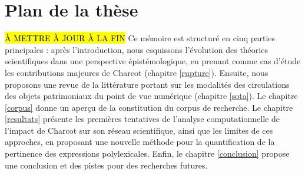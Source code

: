 \section{Plan de la thèse}
\hl{À METTRE À JOUR À LA FIN}
Ce mémoire est structuré en cinq parties principales : après l'introduction, nous esquissons l'évolution des théories scientifiques dans une perspective épistémologique, en prenant comme cas d'étude les contributions majeures de Charcot (chapitre \ref{rupture}).
Ensuite, nous proposons une revue de la littérature portant sur les modalités des circulations des objets patrimoniaux du point de vue numérique (chapitre \ref{sota}). Le chapitre \ref{corpus} donne un aperçu de la constitution du corpus de recherche. Le chapitre \ref{resultats} présente les premières tentatives de l'analyse computationnelle de l'impact de Charcot sur son réseau scientifique, ainsi que les limites de ces approches, en proposant une nouvelle méthode pour la quantification de la pertinence des expressions polylexicales. Enfin, le chapitre \ref{conclusion} propose une conclusion et des pistes pour des recherches futures.


